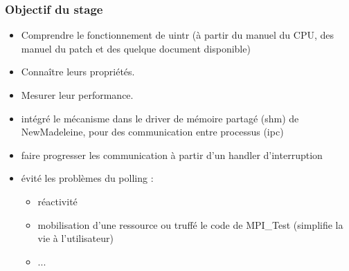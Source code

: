 \subsubsection{Objectif du stage}

\begin{itemize}
  \item Comprendre le fonctionnement de uintr (à partir du manuel du CPU, des manuel du patch et des quelque document disponible)
  \item Connaître leurs propriétés.
  \item Mesurer leur performance.
  \item intégré le mécanisme dans le driver de mémoire partagé (shm) de NewMadeleine, pour des communication entre processus (ipc)
  \item faire progresser les communication à partir d'un handler d'interruption
  \item évité les problèmes du polling :
  \begin{itemize}
    \item réactivité
    \item mobilisation d'une ressource ou truffé le code de MPI_Test (simplifie la vie à l'utilisateur)
    \item ...
  \end{itemize}
\end{itemize}
